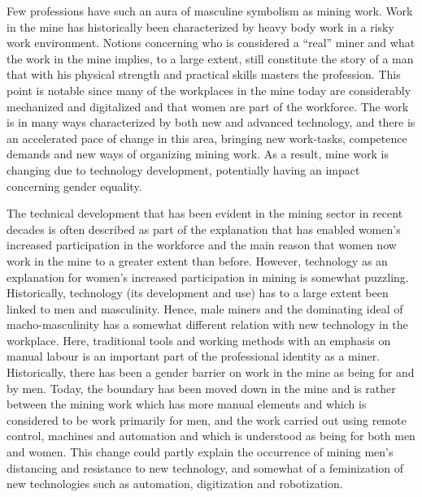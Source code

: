 \documentclass[
  12pt,
]{scrbook}
\begin{document}
Few professions have such an aura of masculine symbolism as mining work. Work in the mine has historically been characterized by heavy body work in a risky work environment. Notions concerning who is considered a ``real'' miner and what the work in the mine implies, to a large extent, still constitute the story of a man that with his physical strength and practical skills masters the profession. This point is notable since many of the workplaces in the mine today are considerably mechanized and digitalized and that women are part of the workforce. The work is in many ways characterized by both new and advanced technology, and there is an accelerated pace of change in this area, bringing new work-tasks, competence demands and new ways of organizing mining work. As a result, mine work is changing due to technology development, potentially having an impact concerning gender equality.

The technical development that has been evident in the mining sector in recent decades is often described as part of the explanation that has enabled women's increased participation in the workforce and the main reason that women now work in the mine to a greater extent than before. However, technology as an explanation for women's increased participation in mining is somewhat puzzling. Historically, technology (its development and use) has to a large extent been linked to men and masculinity. Hence, male miners and the dominating ideal of macho-masculinity has a somewhat different relation with new technology in the workplace. Here, traditional tools and working methods with an emphasis on manual labour is an important part of the professional identity as a miner. Historically, there has been a gender barrier on work in the mine as being for and by men. Today, the boundary has been moved down in the mine and is rather between the mining work which has more manual elements and which is considered to be work primarily for men, and the work carried out using remote control, machines and automation and which is understood as being for both men and women. This change could partly explain the occurrence of mining men's distancing and resistance to new technology, and somewhat of a feminization of new technologies such as automation, digitization and robotization.
\end{document}
